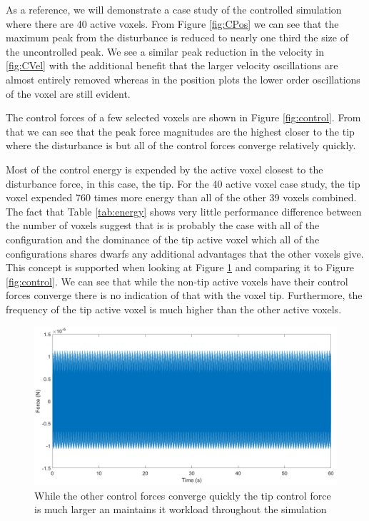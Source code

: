 \documentclass[11pt]{ucthesis}
\begin{document}
As a reference, we will demonstrate a case study of the controlled simulation where there are 40 active voxels. From Figure \ref{fig:CPos} we can see that the maximum peak from the disturbance is reduced to nearly one third the size of the uncontrolled peak. We see a similar peak reduction in the velocity in \ref{fig:CVel} with the additional benefit that the larger velocity oscillations are almost entirely removed whereas in the position plots the lower order oscillations of the voxel are still evident.

The control forces of a few selected voxels are shown in Figure \ref{fig:control}. From that we can see that the peak force magnitudes are the highest closer to the tip where the disturbance is but all of the control forces converge relatively quickly.

Most of the control energy is expended by the active voxel closest to the disturbance force, in this case, the tip. For the 40 active voxel case study, the tip voxel expended 760 times more energy than all of the other 39 voxels combined. The fact that Table \ref{tab:energy} shows very little performance difference between the number of voxels suggest that is is probably the case with all of the configuration and the dominance of the tip active voxel which all of the configurations shares dwarfs any additional advantages that the other voxels give. This concept is supported when looking at Figure \ref{fig:tipC} and comparing it to Figure \ref{fig:control}. We can see that while the non-tip active voxels have their control forces converge there is no indication of that with the voxel tip. Furthermore, the frequency of the tip active voxel is much higher than the other active voxels.

\begin{figure}[thpb]
\centering
\includegraphics[width=0.75\linewidth]{Figures/Force40ControlledTip12_10_206.png}
\caption{While the other control forces converge quickly the tip control force is much larger an maintains it workload throughout the simulation}
\label{fig:tipC}
\end{figure}
\end{document}
